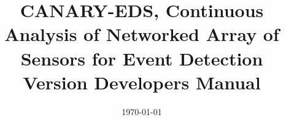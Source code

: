 \documentclass[ps2pdf,11pt,report]{SANDreport}
\title{CANARY-EDS, Continuous Analysis of Networked Array of Sensors 
for Event Detection\\\vspace{5mm}Version \CanaryVersion\space Developers Manual}
\author{\CanaryAuthorLong}
\date{\today}
\begin{document}
\maketitle

\begin{abstract}
\CanaryAbstractShared
\CanaryAbstractDev
\end{abstract}

\setcounter{page}{3}
\clearemptydoublepage

\tableofcontents
\clearemptydoublepage

\SANDmain 

%   
\end{document}

